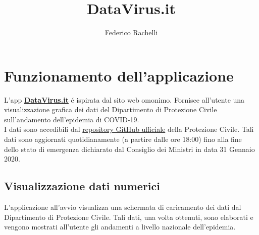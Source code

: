 \documentclass{article}
\begin{document}
    \author{Federico Rachelli}
    \title{\vspace{-2cm}DataVirus.it}
    \maketitle
    
    \section{Funzionamento dell'applicazione}

    L'app \textbf{\href{https://datavirus.it}{DataVirus.it}} é ispirata dal sito web omonimo.
    Fornisce all'utente una visualizzazione grafica dei dati del Dipartimento di Protezione Civile sull'andamento dell'epidemia di COVID-19.
    \\
    I dati sono accedibili dal \href{https://github.com/pcm-dpc/COVID-19}{repository GitHub ufficiale} della Protezione Civile. 
    Tali dati sono aggiornati quotidianamente (a partire dalle ore 18:00) fino alla fine dello stato di emergenza dichiarato dal Consiglio dei Ministri in data 31 Gennaio 2020.
    
    \subsection{Visualizzazione dati numerici}
    L'applicazione all'avvio visualizza una schermata di caricamento dei dati dal Dipartimento di Protezione Civile. 
    Tali dati, una volta ottenuti, sono elaborati e vengono mostrati all'utente gli andamenti a livello nazionale dell'epidemia.
    
\end{document}
